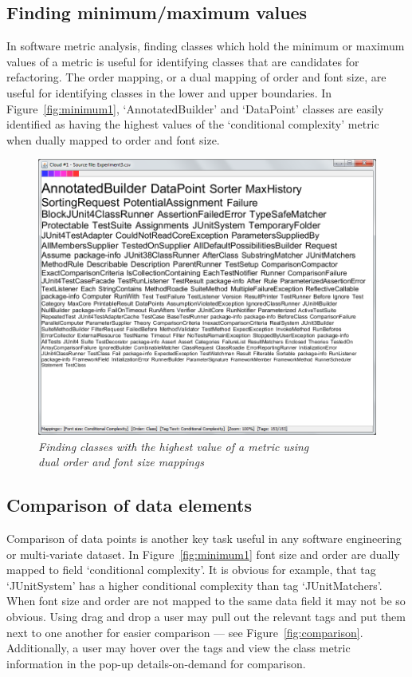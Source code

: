 \subsection{Finding minimum/maximum values}

In software metric analysis, finding classes which hold the minimum or maximum values of a metric is useful for identifying classes that are candidates for refactoring. The order mapping, or a dual mapping of order and font size, are useful for identifying classes in the lower and upper boundaries. In Figure~\vref{fig:minimum1}, `AnnotatedBuilder' and `DataPoint' classes are easily identified as having the highest values of the `conditional complexity' metric when dually mapped to order and font size.

\begin{figure}[!htb]
  	\centering
   	\includegraphics[scale=0.40]{minimum1.png}
  	\caption{\textit{Finding classes with the highest value of a metric using \\dual order and font size mappings}}
	\label{fig:minimum1}
\end{figure}

\subsection{Comparison of data elements}

Comparison of data points is another key task useful in any software engineering or multi-variate dataset. In Figure~\vref{fig:minimum1} font size and order are dually mapped to field `conditional complexity'.  It is obvious for example, that tag `JUnitSystem' has a higher conditional complexity than tag `JUnitMatchers'. When font size and order are not mapped to the same data field it may not be so obvious. Using drag and drop a user may pull out the relevant tags and put them next to one another for easier comparison --- see Figure~\vref{fig:comparison}. Additionally, a user may hover over the tags and view the class metric information in the pop-up details-on-demand for comparison.

